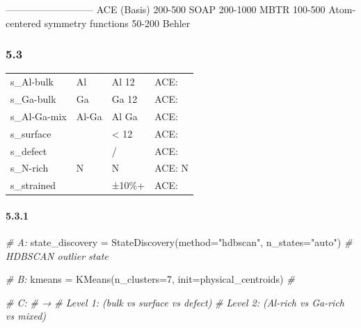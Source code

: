 \documentclass[
  12pt,
]{article}
\newenvironment{Shaded}{}{}
\newcommand{\CommentTok}[1]{\textcolor[rgb]{0.38,0.63,0.69}{\textit{#1}}}
\newcommand{\DecValTok}[1]{\textcolor[rgb]{0.25,0.63,0.44}{#1}}
\newcommand{\NormalTok}[1]{#1}
\newcommand{\OperatorTok}[1]{\textcolor[rgb]{0.40,0.40,0.40}{#1}}
\newcommand{\StringTok}[1]{\textcolor[rgb]{0.25,0.44,0.63}{#1}}
\begin{document}
 \textbar{}  \textbar{}  \textbar{} 
\textbar{}  \textbar{}
\textbar--------\textbar------\textbar------\textbar--------\textbar{}
\textbar{} ACE (Basis) \textbar{} 200-500 \textbar{} 
\textbar{}  \textbar{} \textbar{} SOAP \textbar{} 200-1000
\textbar{}  \textbar{}  \textbar{} \textbar{} MBTR
\textbar{} 100-500 \textbar{}  \textbar{}  \textbar{}
\textbar{} Atom-centered symmetry functions \textbar{} 50-200 \textbar{}
Behler  \textbar{}  \textbar{}

\subsubsection{5.3
}\label{ux72b6ux6001ux7a7aux95f4ux5b9aux4e49}



\begin{longtable}[]{@{}llll@{}}
\toprule\noalign{}
 &  &  &  \\
\midrule\noalign{}
\endhead
\bottomrule\noalign{}
\endlastfoot
s\_Al-bulk & Al  & Al  12 & ACE:  \\
s\_Ga-bulk & Ga  & Ga  12 & ACE:  \\
s\_Al-Ga-mix & Al-Ga  &  Al  Ga & ACE:  \\
s\_surface &  &  \textless{} 12 & ACE:  \\
s\_defect &  & / & ACE:  \\
s\_N-rich &  N  & N  & ACE: N  \\
s\_strained &  &  ±10\%+ & ACE:  \\
\end{longtable}

\paragraph{5.3.1
}\label{ux72b6ux6001ux53d1ux73b0ux7b56ux7565}

\begin{Shaded}
\begin{Highlighting}[]
\CommentTok{\#  A: }
\NormalTok{state\_discovery }\OperatorTok{=}\NormalTok{ StateDiscovery(method}\OperatorTok{=}\StringTok{"hdbscan"}\NormalTok{, n\_states}\OperatorTok{=}\StringTok{"auto"}\NormalTok{)}
\CommentTok{\# HDBSCAN  outlier state}

\CommentTok{\#  B: }
\NormalTok{kmeans }\OperatorTok{=}\NormalTok{ KMeans(n\_clusters}\OperatorTok{=}\DecValTok{7}\NormalTok{, init}\OperatorTok{=}\NormalTok{physical\_centroids)}
\CommentTok{\# }

\CommentTok{\#  C: }
\CommentTok{\#  → }
\CommentTok{\# Level 1:  (bulk vs surface vs defect)}
\CommentTok{\# Level 2:  (Al{-}rich vs Ga{-}rich vs mixed)}
\end{Highlighting}
\end{Shaded}
\end{document}
